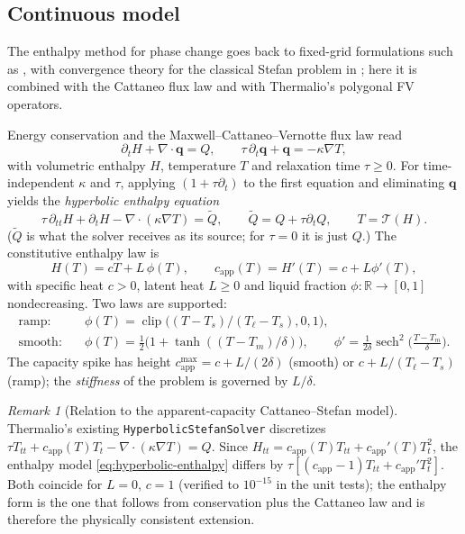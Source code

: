 \documentclass[11pt]{article}
\numberwithin{equation}{section}
\theoremstyle{remark}
\newtheorem{remark}[proposition]{Remark}
\newcommand{\R}{\mathbb{R}}
\newcommand{\capp}{c_{\mathrm{app}}}
\begin{document}
\subsection{Continuous model}

The enthalpy method for phase change goes back to fixed-grid formulations such
as \cite{voller1987,voller1991}, with convergence theory for the classical Stefan
problem in \cite{elliott1987}; here it is combined with the Cattaneo flux law
\cite{cattaneo1958,tzou2015} and with Thermalio's polygonal FV operators.

Energy conservation and the Maxwell--Cattaneo--Vernotte flux law read
\begin{equation}
  \partial_t H + \nabla\cdot\bm q = Q, \qquad
  \tau\,\partial_t\bm q + \bm q = -\kappa\nabla T,
\end{equation}
with volumetric enthalpy $H$, temperature $T$ and relaxation time $\tau\ge 0$.
For time-independent $\kappa$ and $\tau$, applying $(1+\tau\partial_t)$ to the
first equation and eliminating $\bm q$ yields the \emph{hyperbolic enthalpy
equation}
\begin{equation}
  \tau\,\partial_{tt}H + \partial_t H - \nabla\cdot(\kappa\nabla T) = \tilde Q,
  \qquad \tilde Q = Q + \tau\partial_t Q,
  \qquad T = \mathcal T(H).
  \label{eq:hyperbolic-enthalpy}
\end{equation}
($\tilde Q$ is what the solver receives as its source; for $\tau=0$ it is just
$Q$.)  The constitutive enthalpy law is
\begin{equation}
  H(T) = cT + L\,\phi(T), \qquad \capp(T) = H'(T) = c + L\phi'(T),
  \label{eq:enthalpy-law}
\end{equation}
with specific heat $c>0$, latent heat $L\ge0$ and liquid fraction
$\phi:\R\to[0,1]$ nondecreasing.  Two laws are supported:
\begin{align}
  \text{ramp:}\quad & \phi(T)=\operatorname{clip}\big((T-T_s)/(T_\ell-T_s),0,1\big),
  \label{eq:ramp}\\
  \text{smooth:}\quad & \phi(T)=\tfrac12\big(1+\tanh((T-T_m)/\delta)\big),
  \qquad \phi'=\tfrac{1}{2\delta}\operatorname{sech}^2\!\big(\tfrac{T-T_m}{\delta}\big).
  \label{eq:tanh}
\end{align}
The capacity spike has height $\capp^{\max}=c+L/(2\delta)$ (smooth) or
$c+L/(T_\ell-T_s)$ (ramp); the \emph{stiffness} of the problem is governed by
$L/\delta$.

\begin{remark}[Relation to the apparent-capacity Cattaneo--Stefan model]
Thermalio's existing \texttt{HyperbolicStefanSolver} discretizes
$\tau T_{tt}+\capp(T)T_t-\nabla\cdot(\kappa\nabla T)=Q$.  Since
$H_{tt}=\capp(T)T_{tt}+\capp'(T)T_t^2$, the enthalpy model
\eqref{eq:hyperbolic-enthalpy} differs by $\tau[(\capp-1)T_{tt}+\capp'T_t^2]$.
Both coincide for $L=0$, $c=1$ (verified to $10^{-15}$ in the unit tests); the
enthalpy form is the one that follows from conservation plus the Cattaneo law
and is therefore the physically consistent extension.
\end{remark}
\end{document}
